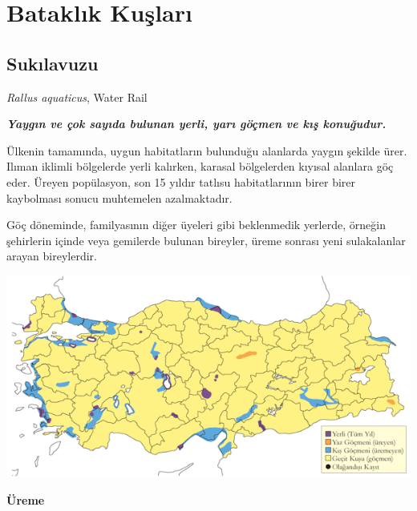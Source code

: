 \documentclass[
  a4paper,
  DIV=11,
  numbers=noendperiod]{scrreprt}
\begin{document}

\chapter{Bataklık Kuşları}\label{bataklux131k-kuux15flarux131}

\section{Sukılavuzu}\label{sukux131lavuzu}

\emph{Rallus aquaticus}, Water Rail

\textbf{\emph{Yaygın ve çok sayıda bulunan yerli, yarı göçmen ve kış
konuğudur.}}

Ülkenin tamamında, uygun habitatların bulunduğu alanlarda yaygın şekilde
ürer. Ilıman iklimli bölgelerde yerli kalırken, karasal bölgelerden
kıyısal alanlara göç eder. Üreyen popülasyon, son 15 yıldır tatlısu
habitatlarının birer birer kaybolması sonucu muhtemelen azalmaktadır.

Göç döneminde, familyasının diğer üyeleri gibi beklenmedik yerlerde,
örneğin şehirlerin içinde veya gemilerde bulunan bireyler, üreme sonrası
yeni sulakalanlar arayan bireylerdir.

\includegraphics{images/harita_Page_115.png}

\textbf{Üreme}
\end{document}
